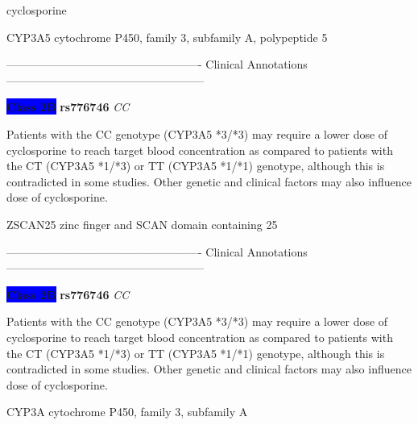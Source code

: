 \documentclass{resume} %
\begin{document}
\begin{rSection}{ cyclosporine }
\begin{rSubsection}{ CYP3A5 }{ cytochrome P450, family 3, subfamily A, polypeptide 5 }{}{}
\item[] ---------------------------------------------------- Clinical Annotations -----------------------------------------------------\newline
\item \textbf{\colorbox{blue} {Class 2B}} \textbf{ rs776746 } \textit{ CC }
\item[] Patients with the CC genotype (CYP3A5 *3/*3) may require a lower dose of cyclosporine to reach target blood concentration as compared to patients with the CT (CYP3A5 *1/*3) or TT (CYP3A5 *1/*1) genotype, although this is contradicted in some studies. Other genetic and clinical factors may also influence dose of cyclosporine.
\end{rSubsection}\begin{rSubsection}{ ZSCAN25 }{ zinc finger and SCAN domain containing 25 }{}{}
\item[]

\item[] ---------------------------------------------------- Clinical Annotations -----------------------------------------------------\newline
\item \textbf{\colorbox{blue} {Class 2B}} \textbf{ rs776746 } \textit{ CC }
\item[] Patients with the CC genotype (CYP3A5 *3/*3) may require a lower dose of cyclosporine to reach target blood concentration as compared to patients with the CT (CYP3A5 *1/*3) or TT (CYP3A5 *1/*1) genotype, although this is contradicted in some studies. Other genetic and clinical factors may also influence dose of cyclosporine.
\end{rSubsection}\begin{rSubsection}{ CYP3A }{ cytochrome P450, family 3, subfamily A }{}{}
\item[]


\end{rSubsection}
\end{rSection}
\end{document}
